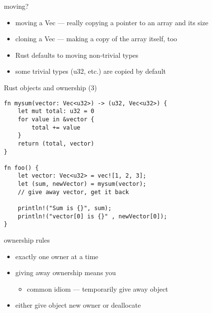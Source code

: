 \begin{frame}{moving?}
    \begin{itemize}
    \item moving a Vec --- really copying a pointer to an array and its size
    \item cloning a Vec --- making a copy of the array itself, too
    \vspace{.5cm}
    \item Rust defaults to moving non-trivial types
    \item some trivial types (u32, etc.) are copied by default
    \end{itemize}
\end{frame}

\begin{frame}[fragile,label=rustOwnership3]{Rust objects and ownership (3)}
    \begin{verbatim}
fn mysum(vector: Vec<u32>) -> (u32, Vec<u32>) {
    let mut total: u32 = 0
    for value in &vector {
        total += value
    }
    return (total, vector)
}

fn foo() {
    let vector: Vec<u32> = vec![1, 2, 3];
    let (sum, newVector) = mysum(vector);
    // give away vector, get it back
    
    println!("Sum is {}", sum);
    println!("vector[0] is {}" , newVector[0]);
}
\end{verbatim}
\end{frame}

\begin{frame}{ownership rules}
    \begin{itemize}
    \item exactly one owner at a time
    \item giving away ownership means you 
        \begin{itemize}
        \item<2> common idiom --- temporarily give away object
        \end{itemize}
    \item either give object new owner or deallocate
    \end{itemize}
\end{frame}

